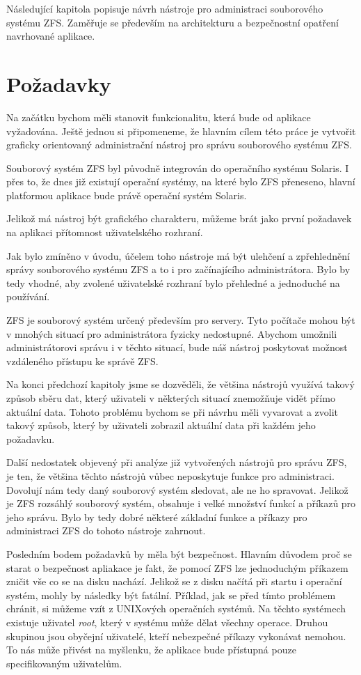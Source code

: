 Následující kapitola popisuje návrh nástroje pro administraci souborového systému ZFS. Zaměřuje se především na architekturu a bezpečnostní opatření navrhované aplikace.
\section{Požadavky}
Na začátku bychom měli stanovit funkcionalitu, která bude od aplikace vyžadována. Ještě jednou si připomeneme, že hlavním cílem této práce je vytvořit graficky orientovaný administrační nástroj pro správu souborového systému ZFS.

Souborový systém ZFS byl původně integrován do operačního systému Solaris. I přes to, že dnes již existují operační systémy, na které bylo ZFS přeneseno, hlavní platformou aplikace bude právě operační systém Solaris.

Jelikož má nástroj být grafického charakteru, můžeme brát jako první požadavek na aplikaci přítomnost uživatelského rozhraní.

Jak bylo zmíněno v úvodu, účelem toho nástroje má být ulehčení a zpřehlednění správy souborového systému ZFS a to i pro začínajícího administrátora. Bylo by tedy vhodné, aby zvolené uživatelské rozhraní bylo přehledné a jednoduché na používání.

ZFS je souborový systém určený především pro servery. Tyto počítače mohou být v mnohých situací pro administrátora fyzicky nedostupné. Abychom umožnili administrátorovi správu i v těchto situací, bude náš nástroj poskytovat možnost vzdáleného přístupu ke správě ZFS.

Na konci předchozí kapitoly jsme se dozvěděli, že většina nástrojů využívá takový způsob sběru dat, který uživateli v některých situací znemožňuje vidět přímo aktuální data. Tohoto problému bychom se při návrhu měli vyvarovat a zvolit takový způsob, který by uživateli zobrazil aktuální data při každém jeho požadavku.

Další nedostatek objevený při analýze již vytvořených nástrojů pro správu ZFS, je ten, že většina těchto nástrojů vůbec neposkytuje funkce pro administraci. Dovolují nám tedy daný souborový systém sledovat, ale ne ho spravovat. Jelikož je ZFS rozsáhlý souborový systém, obsahuje i velké množství funkcí a příkazů pro jeho správu. Bylo by tedy dobré některé základní funkce a příkazy pro administraci ZFS do tohoto nástroje zahrnout.

Posledním bodem požadavků by měla být bezpečnost. Hlavním důvodem proč se starat o bezpečnost apliakace je fakt, že pomocí ZFS lze jednoduchým příkazem zničit vše co se na disku nachází. Jelikož se z disku načítá při startu i operační systém, mohly by následky být fatální. Příklad, jak se před tímto problémem chránit, si můžeme vzít z UNIXových operačních systémů. Na těchto systémech existuje uživatel \emph{root}, který v systému může dělat všechny operace. Druhou skupinou jsou obyčejní uživatelé, kteří nebezpečné příkazy vykonávat nemohou. To nás může přivést na myšlenku, že aplikace bude přístupná pouze specifikovaným uživatelům.

